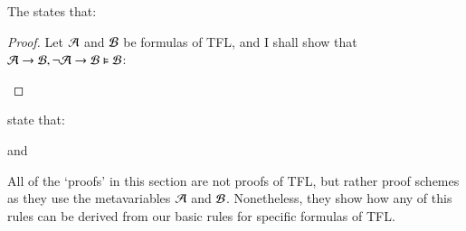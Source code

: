\begin{definition}
    The  states that: \begin{fitchproof}
        \open
        \close
        \open 
        \close
         
    \end{fitchproof}
\end{definition}
\begin{proof}
    Let $\mathcal{A}$ and $\mathcal{B}$ be formulas of TFL, and I shall show that $\mathcal{A}\rightarrow\mathcal{B},\neg\mathcal{A}\rightarrow\mathcal{B}\vDash \mathcal{B}$:
    \begin{fitchproof}
        \open
             
             
             
        \close
         
    \end{fitchproof}
\end{proof}


\begin{definition}
     state that: \begin{fitchproof}
         
    \end{fitchproof}
    \begin{fitchproof}
         
    \end{fitchproof}
     \begin{fitchproof}
          
    \end{fitchproof}
    and
    \begin{fitchproof}
         
    \end{fitchproof}
\end{definition}


\begin{remark}
    All of the `proofs' in this section are not proofs of TFL, but rather proof schemes as they use the metavariables $\mathcal{A}$ and $\mathcal{B}$. Nonetheless, they show how any of this rules can be derived from our basic rules for specific formulas of TFL.
\end{remark}


